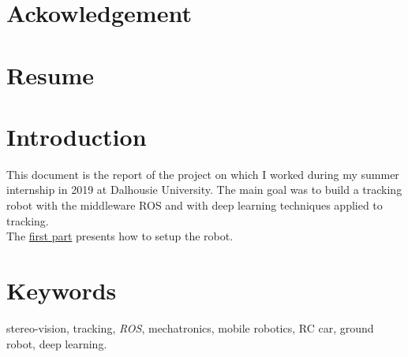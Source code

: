 

\section*{Ackowledgement}\label{thk}


\clearpage

\section*{Resume}


\clearpage
\section*{Introduction}

This document is the report of the project on which 
I worked during my summer internship in 2019 at Dalhousie 
University. The main goal was to build a tracking robot
with the middleware ROS and with deep learning techniques 
applied to tracking.
\\\indent The \hyperref[setup]{first part} presents how to 
setup the robot.

\section*{Keywords} stereo-vision, tracking, \textit{ROS},
mechatronics, mobile robotics, RC car, ground robot, deep learning.



